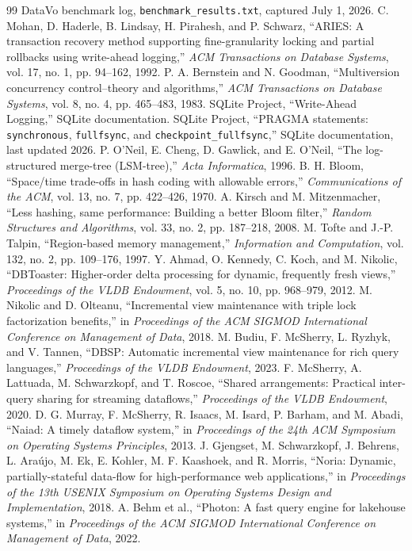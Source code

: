 \documentclass[11pt]{article}
\begin{document}
\begin{thebibliography}{99}
DataVo benchmark log, \texttt{benchmark\_results.txt}, captured July 1, 2026.
C. Mohan, D. Haderle, B. Lindsay, H. Pirahesh, and P. Schwarz, ``ARIES: A transaction recovery method supporting fine-granularity locking and partial rollbacks using write-ahead logging,'' \emph{ACM Transactions on Database Systems}, vol. 17, no. 1, pp. 94--162, 1992.
P. A. Bernstein and N. Goodman, ``Multiversion concurrency control--theory and algorithms,'' \emph{ACM Transactions on Database Systems}, vol. 8, no. 4, pp. 465--483, 1983.
SQLite Project, ``Write-Ahead Logging,'' SQLite documentation.
SQLite Project, ``PRAGMA statements: \texttt{synchronous}, \texttt{fullfsync}, and \texttt{checkpoint\_fullfsync},'' SQLite documentation, last updated 2026.
P. O'Neil, E. Cheng, D. Gawlick, and E. O'Neil, ``The log-structured merge-tree (LSM-tree),'' \emph{Acta Informatica}, 1996.
B. H. Bloom, ``Space/time trade-offs in hash coding with allowable errors,'' \emph{Communications of the ACM}, vol. 13, no. 7, pp. 422--426, 1970.
A. Kirsch and M. Mitzenmacher, ``Less hashing, same performance: Building a better Bloom filter,'' \emph{Random Structures and Algorithms}, vol. 33, no. 2, pp. 187--218, 2008.
M. Tofte and J.-P. Talpin, ``Region-based memory management,'' \emph{Information and Computation}, vol. 132, no. 2, pp. 109--176, 1997.
Y. Ahmad, O. Kennedy, C. Koch, and M. Nikolic, ``DBToaster: Higher-order delta processing for dynamic, frequently fresh views,'' \emph{Proceedings of the VLDB Endowment}, vol. 5, no. 10, pp. 968--979, 2012.
M. Nikolic and D. Olteanu, ``Incremental view maintenance with triple lock factorization benefits,'' in \emph{Proceedings of the ACM SIGMOD International Conference on Management of Data}, 2018.
M. Budiu, F. McSherry, L. Ryzhyk, and V. Tannen, ``DBSP: Automatic incremental view maintenance for rich query languages,'' \emph{Proceedings of the VLDB Endowment}, 2023.
F. McSherry, A. Lattuada, M. Schwarzkopf, and T. Roscoe, ``Shared arrangements: Practical inter-query sharing for streaming dataflows,'' \emph{Proceedings of the VLDB Endowment}, 2020.
D. G. Murray, F. McSherry, R. Isaacs, M. Isard, P. Barham, and M. Abadi, ``Naiad: A timely dataflow system,'' in \emph{Proceedings of the 24th ACM Symposium on Operating Systems Principles}, 2013.
J. Gjengset, M. Schwarzkopf, J. Behrens, L. Araújo, M. Ek, E. Kohler, M. F. Kaashoek, and R. Morris, ``Noria: Dynamic, partially-stateful data-flow for high-performance web applications,'' in \emph{Proceedings of the 13th USENIX Symposium on Operating Systems Design and Implementation}, 2018.
A. Behm et al., ``Photon: A fast query engine for lakehouse systems,'' in \emph{Proceedings of the ACM SIGMOD International Conference on Management of Data}, 2022.
\end{thebibliography}
\end{document}
